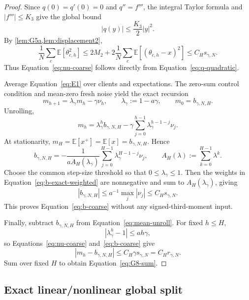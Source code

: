 \documentclass[11pt]{article}
\theoremstyle{definition}
\newcommand{\E}{\mathbb{E}}
\newcommand{\smallscale}{s_{\gamma,N}}
\newcommand{\remscale}{r_{\gamma,N}}
\newcommand{\bstat}{b_{\gamma,N,H}}
\begin{document}
\begin{proof}
Since $q(0)=q'(0)=0$ and $q''=f'''$, the integral Taylor formula and $|f'''|\le K_3$ give the global bound
\begin{equation}
\label{eq:q-quadratic}
  |q(y)|\le \frac{K_3}{2}|y|^2.
\end{equation}
By \cref{lem:G5a,lem:displacement2},
\[
  \frac1N\sum_c\E[\theta_{c,h}^2]
  \le 2M_2+2\frac1N\sum_c\E[(\theta_{c,h}-x)^2]
  \le C_H\smallscale.
\]
Thus Equation~\eqref{eq:nu-coarse} follows directly from Equation~\eqref{eq:q-quadratic}.

Average Equation~\eqref{eq:E1} over clients and expectations. The zero-sum control condition and mean-zero fresh noise yield the exact recursion
\begin{equation}
\label{eq:mean-recursion}
  m_{h+1}=\lambda_\gamma m_h-\gamma\nu_h,
  \qquad
  \lambda_\gamma:=1-a\gamma,
  \qquad m_0=\bstat.
\end{equation}
Unrolling,
\begin{equation}
\label{eq:mean-unroll}
  m_h=\lambda_\gamma^h\bstat
  -\gamma\sum_{j=0}^{h-1}\lambda_\gamma^{h-1-j}\nu_j.
\end{equation}
At stationarity, $m_H=\E[x^+]=\E[x]=\bstat$. Hence
\begin{equation}
\label{eq:b-exact-weighted}
  \bstat=-\frac{1}{aA_H(\lambda_\gamma)}
  \sum_{j=0}^{H-1}\lambda_\gamma^{H-1-j}\nu_j,
  \qquad
  A_H(\lambda):=\sum_{k=0}^{H-1}\lambda^k.
\end{equation}
Choose the common step-size threshold so that $0\le\lambda_\gamma\le1$. Then the weights in Equation~\eqref{eq:b-exact-weighted} are nonnegative and sum to $A_H(\lambda_\gamma)$, giving
\[
  |\bstat|\le a^{-1}\max_j|\nu_j|\le C_H\smallscale.
\]
This proves Equation~\eqref{eq:b-coarse} without any signed-third-moment input.

Finally, subtract $\bstat$ from Equation~\eqref{eq:mean-unroll}. For fixed $h\le H$,
\[
  |\lambda_\gamma^h-1|\le ah\gamma,
\]
so Equations~\eqref{eq:nu-coarse} and~\eqref{eq:b-coarse} give
\[
  |m_h-\bstat|\le C_H\gamma\smallscale=C_H\remscale.
\]
Sum over fixed $H$ to obtain Equation~\eqref{eq:G8-sum}.
\end{proof}

\subsection{Exact linear/nonlinear global split}
\end{document}
